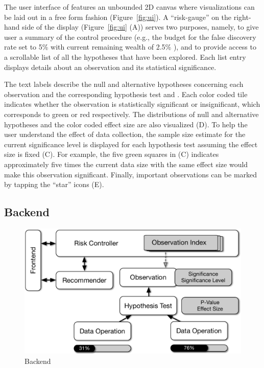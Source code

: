 The user interface of \system{} features an unbounded 2D canvas where visualizations can be laid out in a free form fashion (Figure~\ref{fig:ui}). A ``risk-gauge'' on the right-hand side of the display (Figure~\ref{fig:ui} (A)) serves two purposes, namely, to give user a summary of the control procedure (e.g., the budget for the false discovery rate set to 5\% with current remaining wealth of 2.5\% ), and to provide access to a scrollable list of all the hypotheses that have been explored.
Each list entry displays details about an observation and its statistical significance.  

The text labels describe the null and alternative hypotheses concerning each observation and the corresponding hypothesis test and \pval. Each color coded tile indicates whether the observation is statistically significant or insignificant, which corresponds to green or red respectively.  The distributions of null and alternative hypotheses and the color coded effect size are also visualized (D).  To help the user understand the effect of data collection, the sample size estimate for the current significance level is displayed for each hypothesis test assuming the effect size is fixed (C).  For example, the five green squares in (C) indicates approximately five times the current data size with the same effect size would make this observation significant. Finally, important observations can be marked by tapping the ``star'' icons (E).

\subsection{Backend}
\label{sec:backend}

\begin{figure}
\centering
\includegraphics[scale=0.4]{figures/risk-controller.pdf}
\caption{Backend}
\label{fig:backend}	
\end{figure}

